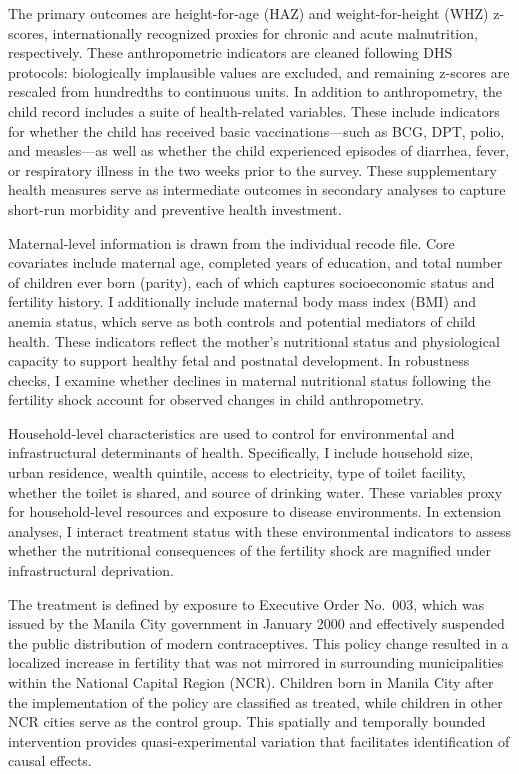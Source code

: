 \documentclass[]{AEA}
\begin{document}
The primary outcomes are height-for-age (HAZ) and weight-for-height
(WHZ) z-scores, internationally recognized proxies for chronic and acute
malnutrition, respectively. These anthropometric indicators are cleaned
following DHS protocols: biologically implausible values are excluded,
and remaining z-scores are rescaled from hundredths to continuous units.
In addition to anthropometry, the child record includes a suite of
health-related variables. These include indicators for whether the child
has received basic vaccinations---such as BCG, DPT, polio, and
measles---as well as whether the child experienced episodes of diarrhea,
fever, or respiratory illness in the two weeks prior to the survey.
These supplementary health measures serve as intermediate outcomes in
secondary analyses to capture short-run morbidity and preventive health
investment.

Maternal-level information is drawn from the individual recode file.
Core covariates include maternal age, completed years of education, and
total number of children ever born (parity), each of which captures
socioeconomic status and fertility history. I additionally include
maternal body mass index (BMI) and anemia status, which serve as both
controls and potential mediators of child health. These indicators
reflect the mother's nutritional status and physiological capacity to
support healthy fetal and postnatal development. In robustness checks, I
examine whether declines in maternal nutritional status following the
fertility shock account for observed changes in child anthropometry.

Household-level characteristics are used to control for environmental
and infrastructural determinants of health. Specifically, I include
household size, urban residence, wealth quintile, access to electricity,
type of toilet facility, whether the toilet is shared, and source of
drinking water. These variables proxy for household-level resources and
exposure to disease environments. In extension analyses, I interact
treatment status with these environmental indicators to assess whether
the nutritional consequences of the fertility shock are magnified under
infrastructural deprivation.

The treatment is defined by exposure to Executive Order No.~003, which
was issued by the Manila City government in January 2000 and effectively
suspended the public distribution of modern contraceptives. This policy
change resulted in a localized increase in fertility that was not
mirrored in surrounding municipalities within the National Capital
Region (NCR). Children born in Manila City after the implementation of
the policy are classified as treated, while children in other NCR cities
serve as the control group. This spatially and temporally bounded
intervention provides quasi-experimental variation that facilitates
identification of causal effects.
\end{document}

